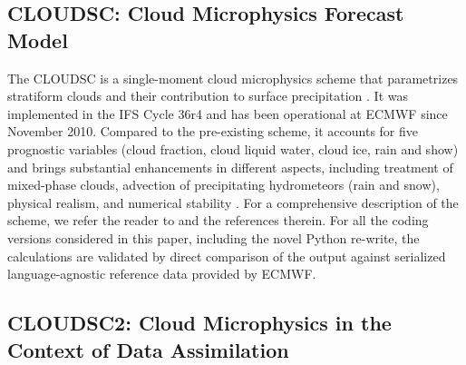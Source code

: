 \documentclass[../main.tex]{subfiles}
\begin{document}

    \subsection{CLOUDSC: Cloud Microphysics Forecast Model}

    The CLOUDSC is a single-moment cloud microphysics scheme that parametrizes stratiform clouds and their contribution to surface precipitation \citep{ifs48r1}. It was implemented in the IFS Cycle 36r4 and has been operational at ECMWF since November 2010. Compared to the pre-existing scheme, it accounts for five prognostic variables (cloud fraction, cloud liquid water, cloud ice, rain and show) and brings substantial enhancements in different aspects, including treatment of mixed-phase clouds, advection of precipitating hydrometeors (rain and snow), physical realism, and numerical stability \citep{nogherotto16}. For a comprehensive description of the scheme, we refer the reader to \citet{forbes11b} and the references therein. For all the coding versions considered in this paper, including the novel Python re-write, the calculations are validated by direct comparison of the output against serialized language-agnostic reference data provided by ECMWF.

    \subsection{CLOUDSC2: Cloud Microphysics in the Context of Data Assimilation}
\end{document}

